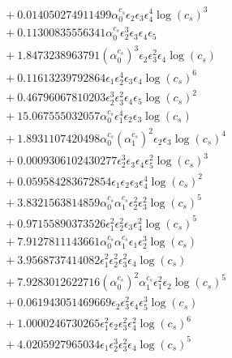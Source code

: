 \documentclass[10pt]{article}
\begin{document}
\begin{align*}
&{}  + 0.014050274911499 \alpha_{0}^{c_s} \epsilon_{2} \epsilon_{3} \epsilon_{4}^{4} \log{\left(c_{s} \right)}^{3} \\
&{}  + 0.11300835556341 \alpha_{0}^{c_s} \epsilon_{2}^{3} \epsilon_{3} \epsilon_{4} \epsilon_{5} \\
&{}  + 1.8473238963791 \left(\alpha_{0}^{c_s}\right)^{3} \epsilon_{2} \epsilon_{3}^{2} \epsilon_{4} \log{\left(c_{s} \right)} \\
&{}  + 0.11613239792864 \epsilon_{1} \epsilon_{2}^{4} \epsilon_{3} \epsilon_{4} \log{\left(c_{s} \right)}^{6} \\
&{}  + 0.46796067810203 \epsilon_{2}^{3} \epsilon_{3}^{2} \epsilon_{4} \epsilon_{5} \log{\left(c_{s} \right)}^{2} \\
&{}  + 15.067555032057 \alpha_{0}^{c_s} \epsilon_{1}^{4} \epsilon_{2} \epsilon_{3} \log{\left(c_{s} \right)} \\
&{}  + 1.8931107420498 \alpha_{0}^{c_s} \left(\alpha_{1}^{c_s}\right)^{2} \epsilon_{2} \epsilon_{3} \log{\left(c_{s} \right)}^{4} \\
&{}  + 0.0009306102430277 \epsilon_{2}^{3} \epsilon_{3} \epsilon_{4} \epsilon_{5}^{2} \log{\left(c_{s} \right)}^{3} \\
&{}  + 0.059584283672854 \epsilon_{1} \epsilon_{2} \epsilon_{3} \epsilon_{4}^{4} \log{\left(c_{s} \right)}^{2} \\
&{}  + 3.8321563814859 \alpha_{0}^{c_s} \alpha_{1}^{c_s} \epsilon_{2}^{2} \epsilon_{3}^{2} \log{\left(c_{s} \right)}^{5} \\
&{}  + 0.97155890373526 \epsilon_{1}^{2} \epsilon_{2}^{2} \epsilon_{3} \epsilon_{4}^{2} \log{\left(c_{s} \right)}^{5} \\
&{}  + 7.9127811143661 \alpha_{0}^{c_s} \alpha_{1}^{c_s} \epsilon_{1} \epsilon_{2}^{3} \log{\left(c_{s} \right)} \\
&{}  + 3.9568737414082 \epsilon_{1}^{2} \epsilon_{2}^{2} \epsilon_{3}^{2} \epsilon_{4} \log{\left(c_{s} \right)} \\
&{}  + 7.9283012622716 \left(\alpha_{0}^{c_s}\right)^{2} \alpha_{1}^{c_s} \epsilon_{1}^{2} \epsilon_{2} \log{\left(c_{s} \right)}^{5} \\
&{}  + 0.061943051469669 \epsilon_{2} \epsilon_{3}^{2} \epsilon_{4} \epsilon_{5}^{3} \log{\left(c_{s} \right)} \\
&{}  + 1.0000246730265 \epsilon_{1}^{2} \epsilon_{2} \epsilon_{3}^{2} \epsilon_{4}^{2} \log{\left(c_{s} \right)}^{6} \\
&{}  + 4.0205927965034 \epsilon_{1} \epsilon_{2}^{3} \epsilon_{3}^{2} \epsilon_{4} \log{\left(c_{s} \right)}^{5} \\

\end{align*}
\end{document}
